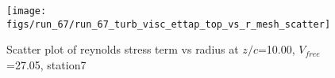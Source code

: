 \begin{figure}[H]
\centering
\texttt{[image: figs/run\_67/run\_67\_turb\_visc\_ettap\_top\_vs\_r\_mesh\_scatter]}
\caption{Scatter plot of reynolds stress term vs radius at $z/c$=10.00, $V_{free}$=27.05, station7}
\label{fig:run_67_turb_visc_ettap_top_vs_r_mesh_scatter}
\end{figure}



